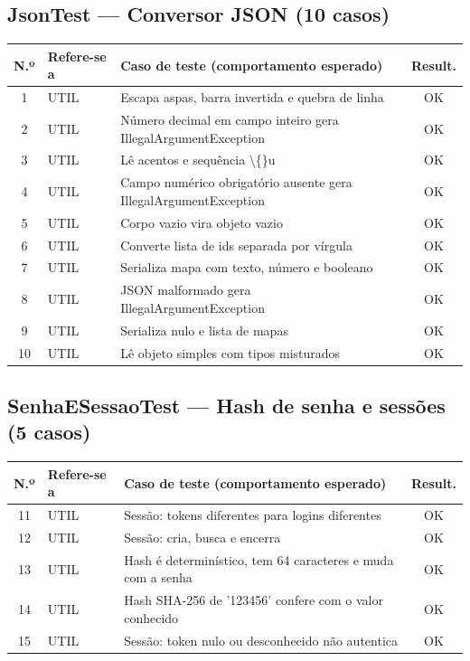 \subsection*{JsonTest --- Conversor JSON (10 casos)}
\footnotesize
\begin{longtable}{|c|p{2.5cm}|p{8.4cm}|c|}
\hline
\rowcolor{gray!30} \textbf{N.º} & \textbf{Refere-se a} & \textbf{Caso de teste (comportamento esperado)} & \textbf{Result.} \\ \hline
\endhead
1 & UTIL & Escapa aspas, barra invertida e quebra de linha & \cellcolor{green!20}OK \\ \hline
2 & UTIL & Número decimal em campo inteiro gera IllegalArgumentException & \cellcolor{green!20}OK \\ \hline
3 & UTIL & Lê acentos e sequência \textbackslash\{\}u & \cellcolor{green!20}OK \\ \hline
4 & UTIL & Campo numérico obrigatório ausente gera IllegalArgumentException & \cellcolor{green!20}OK \\ \hline
5 & UTIL & Corpo vazio vira objeto vazio & \cellcolor{green!20}OK \\ \hline
6 & UTIL & Converte lista de ids separada por vírgula & \cellcolor{green!20}OK \\ \hline
7 & UTIL & Serializa mapa com texto, número e booleano & \cellcolor{green!20}OK \\ \hline
8 & UTIL & JSON malformado gera IllegalArgumentException & \cellcolor{green!20}OK \\ \hline
9 & UTIL & Serializa nulo e lista de mapas & \cellcolor{green!20}OK \\ \hline
10 & UTIL & Lê objeto simples com tipos misturados & \cellcolor{green!20}OK \\ \hline
\end{longtable}\normalsize
\subsection*{SenhaESessaoTest --- Hash de senha e sessões (5 casos)}
\footnotesize
\begin{longtable}{|c|p{2.5cm}|p{8.4cm}|c|}
\hline
\rowcolor{gray!30} \textbf{N.º} & \textbf{Refere-se a} & \textbf{Caso de teste (comportamento esperado)} & \textbf{Result.} \\ \hline
\endhead
11 & UTIL & Sessão: tokens diferentes para logins diferentes & \cellcolor{green!20}OK \\ \hline
12 & UTIL & Sessão: cria, busca e encerra & \cellcolor{green!20}OK \\ \hline
13 & UTIL & Hash é determinístico, tem 64 caracteres e muda com a senha & \cellcolor{green!20}OK \\ \hline
14 & UTIL & Hash SHA-256 de '123456' confere com o valor conhecido & \cellcolor{green!20}OK \\ \hline
15 & UTIL & Sessão: token nulo ou desconhecido não autentica & \cellcolor{green!20}OK \\ \hline
\end{longtable}\normalsize
